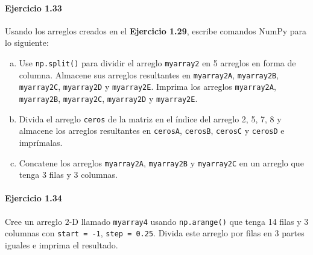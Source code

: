 \paragraph{\color{DarkBlue}Ejercicio 1.33}
Usando los arreglos creados en el \textbf{Ejercicio 1.29},
escribe comandos NumPy para lo siguiente:

\begin{enumerate}[(a)]
	\item

	      Use \texttt{np.split()} para dividir el arreglo
	      \texttt{myarray2} en 5 arreglos en forma de
	      columna.
	      Almacene sus arreglos resultantes en
	      \texttt{myarray2A},
	      \texttt{myarray2B},
	      \texttt{myarray2C},
	      \texttt{myarray2D} y
	      \texttt{myarray2E}.
	      Imprima los arreglos \texttt{myarray2A},
	      \texttt{myarray2B},
	      \texttt{myarray2C},
	      \texttt{myarray2D} y
	      \texttt{myarray2E}.

	\item

	      Divida el arreglo \texttt{ceros} de la matriz
	      en el índice del arreglo 2, 5, 7, 8 y almacene los arreglos
	      resultantes en \texttt{cerosA},
	      \texttt{cerosB}, \texttt{cerosC} y
	      \texttt{cerosD} e imprímalas.

	\item

	      Concatene los arreglos \texttt{myarray2A},
	      \texttt{myarray2B} y
	      \texttt{myarray2C} en un arreglo que tenga 3
	      filas y 3 columnas.
\end{enumerate}

\paragraph{\color{DarkBlue}Ejercicio 1.34}

Cree un arreglo $2$-D llamado \texttt{myarray4} usando
\texttt{np.arange()} que tenga 14 filas y 3 columnas con
\texttt{start = -1}, \texttt{step = 0.25}.
Divida este arreglo por filas en 3 partes iguales e imprima el
resultado.

